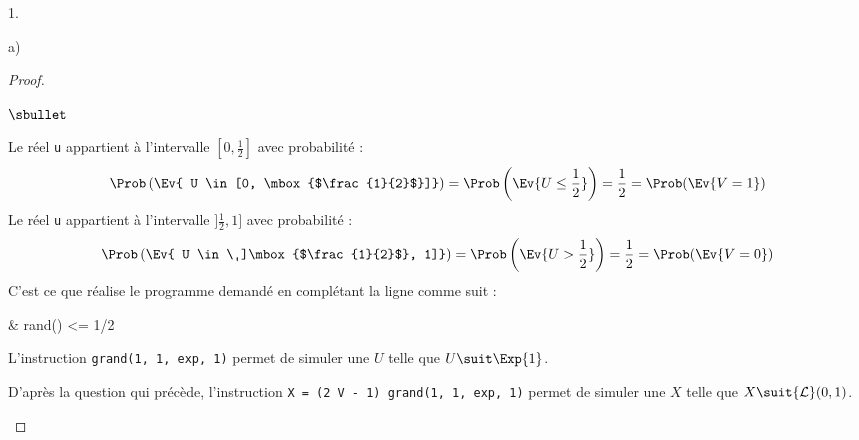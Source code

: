 \documentclass[11pt]{article}%
\begin{document}
\begin{noliste}{1.}
\begin{noliste}{a)}
\begin{proof}
\begin{noliste}{$\sbullet$}
\begin{center}
        \end{center}
        Le réel {\tt u} appartient à l'intervalle $[0, \frac{1}{2}]$
        avec probabilité :
        \[
        \Prob\left(\Ev{ U \in [0, \mbox{$\frac{1}{2}$}]} \right) =
        \Prob\left(\Ev{ U \leq \frac{1}{2}} \right) = \dfrac{1}{2} =
        \Prob(\Ev{ V = 1})
        \]
        Le réel {\tt u} appartient à l'intervalle $]\frac{1}{2}, 1]$
        avec probabilité :
        \[
        \Prob\left(\Ev{ U \in \ ]\mbox{$\frac{1}{2}$}, 1]} \right) =
        \Prob\left(\Ev{ U > \frac{1}{2}} \right) = \dfrac{1}{2} =
        \Prob(\Ev{ V = 0})
        \]
        C'est ce que réalise le programme demandé en complétant la
        ligne  comme suit :
        \begin{scilabC}{1}
          & \qquad {} rand() <= 1/2 \nl %
        \end{scilabC}
        
        
        
        \newpage
        
        
      \item L'instruction {\tt grand(1, 1, \ttq{}exp\ttq{}, 1)} permet
        de simuler une \var $U$ telle que $U \suit \Exp{1}$.

      \item D'après la question qui précède, l'instruction {\tt X = (2
          \Sfois{} V - 1) \Sfois{} grand(1, 1, \ttq{}exp\ttq{}, 1)}
        permet de simuler une \var $X$ telle que $X \suit {\cal L}(0,
        1)$.


\end{noliste}
\end{proof}
\end{noliste}
\end{noliste}
\end{document}
